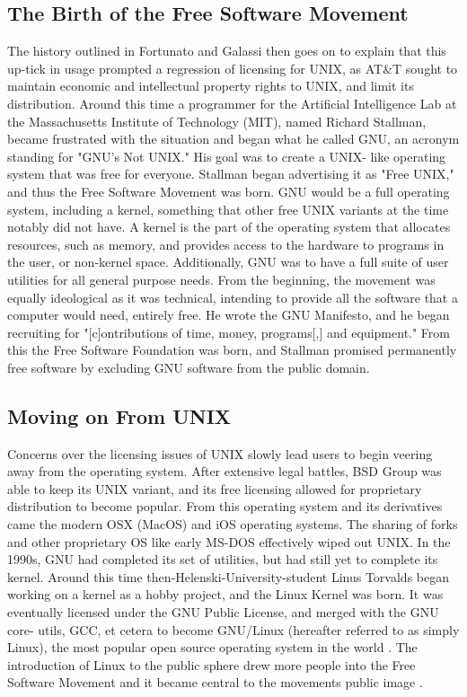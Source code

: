 \documentclass[manuscript,screen,nonacm,12pt]{acmart}
\begin{document}
\subsection{The Birth of the Free Software Movement}
\label{sec:hist-gnu}
The history outlined in Fortunato and Galassi \cite{Fortunato2021} then goes on
to explain that this up-tick in usage prompted a regression of licensing for
UNIX, as AT\&T sought to maintain economic and intellectual property rights to
UNIX, and limit its distribution. Around this time a programmer for the
Artificial Intelligence Lab at the Massachusetts Institute of Technology (MIT),
named Richard Stallman, became frustrated with the situation and began what he called
GNU, an acronym standing for "GNU's Not UNIX." His goal was to create a UNIX-
like operating system that was free for everyone. Stallman began advertising it
as "Free UNIX," and thus the Free Software Movement  was born. GNU would be a
full operating system, including a kernel, something that other free UNIX
variants at the time notably did not have. A kernel is the part of the operating
system that allocates resources, such as memory, and provides access to the
hardware to programs in the user, or non-kernel space. Additionally, GNU was to
have a full suite of user utilities for all general purpose needs. From the
beginning, the movement was equally ideological as it was technical, intending
to provide all the software that a computer would need, entirely free. He wrote
the GNU Manifesto, and he began recruiting for "[c]ontributions of time, money,
programs[,] and equipment." From this the Free Software Foundation was born, and
Stallman promised permanently free software by excluding GNU software from the
public domain.

\subsection{Moving on From UNIX}
Concerns over the licensing issues of UNIX slowly lead users to begin veering
away from the operating system. After extensive legal battles, BSD Group was
able to keep its UNIX variant, and its free licensing allowed for proprietary
distribution to become popular. From this operating system and its derivatives
came the modern OSX (MacOS) and iOS operating systems. The sharing of forks and
other proprietary OS like early MS-DOS effectively wiped out UNIX. In the 1990s,
GNU had completed its set of utilities, but had still yet to complete its
kernel. Around this time then-Helenski-University-student Linus Torvalds began
working on a kernel as a hobby project, and the Linux Kernel was born. It was
eventually licensed under the GNU Public License, and merged with the GNU core-
utils, GCC, et cetera to become GNU/Linux (hereafter referred to as simply
Linux), the most popular open source operating system in the world
\cite{elad2024}. The introduction of Linux to the public sphere drew more people
into the Free Software Movement and it became central to the movements public
image \cite{Fortunato2021}.
\end{document}
